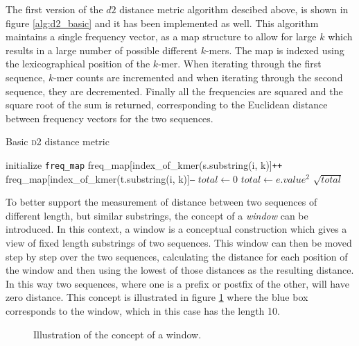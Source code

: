 The first version of the $d2$ distance metric algorithm descibed above, is
shown in figure \ref{alg:d2_basic} and it has been implemented as well. This
algorithm maintains a single frequency vector, as a map structure to allow for
large $k$ which results in a large number of possible different $k$-mers. The
map is indexed using the lexicographical position of the $k$-mer. When
iterating through the first sequence, $k$-mer counts are incremented and when
iterating through the second sequence, they are decremented. Finally all the
frequencies are squared and the square root of the sum is returned,
corresponding to the Euclidean distance between frequency vectors for the two
sequences.

\begin{algorithm}
  \caption{Basic \textsc{d2} distance metric}
  \label{alg:d2_basic}
  \begin{algorithmic}[1]
    \Statex
      \State initialize \texttt{freq\_map}
        \State freq\_map[index\_of\_kmer(s.substring(i, k)]\texttt{++}
      \EndFor
        \State freq\_map[index\_of\_kmer(t.substring(i, k)]\texttt{--}
      \EndFor
      \State $total \gets 0$
        \State $total \gets e.value^2$  
      \EndFor
      \State \Return $\sqrt{total}$
    \EndFunction
  \end{algorithmic}
\end{algorithm}

To better support the measurement of distance between two sequences of
different length, but similar substrings, the concept of a \emph{window} can be
introduced. In this context, a window is a conceptual construction which gives
a view of fixed length substrings of two sequences. This window can then be
moved step by step over the two sequences, calculating the distance for each
position of the window and then using the lowest of those distances as the
resulting distance. In this way two sequences, where one is a prefix or postfix
of the other, will have zero distance. This concept is illustrated in figure
\ref{fig:d2_window_concept} where the blue box corresponds to the window, which
in this case has the length 10.

\begin{figure}[H]
\centering
{}
\caption{Illustration of the concept of a window.}
\label{fig:d2_window_concept}
\end{figure}

